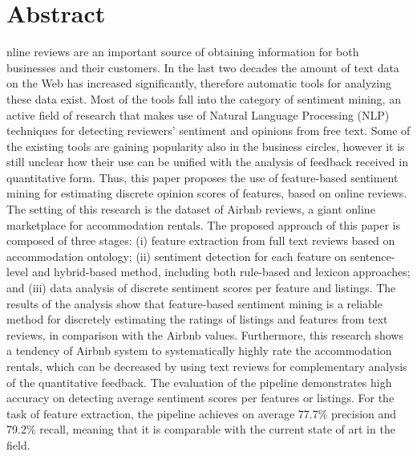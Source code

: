 %

\let\cleardoublepage\clearpage
\chapter{Abstract}
\begin{SingleSpace}

nline reviews are an important source of obtaining information for both businesses and their customers. In the last two decades the amount of text data on the Web has increased significantly, therefore automatic tools for analyzing these data exist. Most of the tools fall into the category of sentiment mining, an active field of research that makes use of Natural Language Processing (NLP) techniques for detecting reviewers' sentiment and opinions from free text. Some of the existing tools are gaining popularity also in the business circles, however it is still unclear how their use can be unified with the analysis of feedback received in quantitative form. Thus, this paper proposes the use of feature-based sentiment mining for estimating discrete opinion scores of features, based on online reviews. The setting of this research is the dataset of Airbnb reviews, a giant online marketplace for accommodation rentals. The proposed approach of this paper is composed of three stages: (i) feature extraction from full text reviews based on accommodation ontology; (ii) sentiment detection for each feature on sentence-level and hybrid-based method, including both rule-based and lexicon approaches; and (iii) data analysis of discrete sentiment scores per feature and listings. The results of the analysis show that feature-based sentiment mining is a reliable method for discretely estimating the ratings of listings and features from text reviews, in comparison with the Airbnb values. Furthermore, this research shows a tendency of Airbnb system to systematically highly rate the accommodation rentals, which can be decreased by using text reviews for complementary analysis of the quantitative feedback. The evaluation of the pipeline demonstrates high accuracy on detecting average sentiment scores per features or listings. For the task of feature extraction, the pipeline achieves on average 77.7\% precision and 79.2\% recall, meaning that it is comparable with the current state of art in the field. 
\end{SingleSpace}
\clearpage